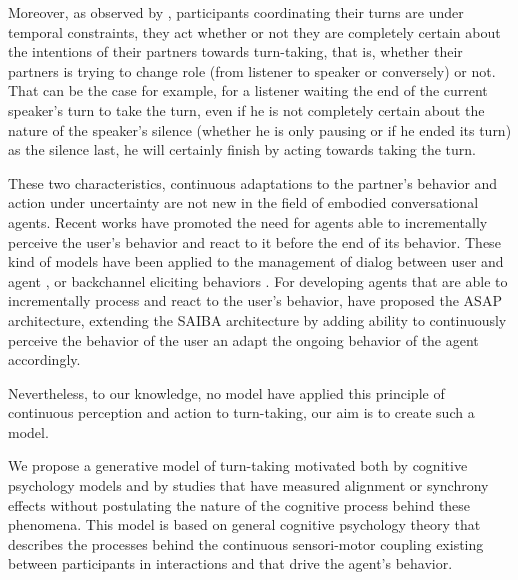  Moreover, as observed by \cite{thorisson_natural_2002}, participants coordinating their turns are under temporal constraints, they act whether or not they are completely certain about the intentions of their partners towards turn-taking, that is, whether their partners is trying to change role (from listener to speaker or conversely) or not. That can be the case for example, for a listener waiting the end of the current speaker's turn to take the turn, even if he is not completely certain about the nature of the speaker's silence (whether he is only pausing or if he ended its turn) as the silence last, he will certainly finish by acting towards taking the turn.
 	
 These two characteristics, continuous adaptations to the partner's behavior and action under uncertainty are not new in the field of embodied conversational agents. Recent works have promoted the need for agents able to incrementally perceive the user's behavior and react to it before the end of its behavior. These kind of models have been applied to the management of dialog between user and agent \cite{skantze_towards_2010}, or backchannel eliciting behaviors \cite{bushmeier_when_2014}. For developing agents that are able to incrementally process and react to the user's behavior, \cite{kopp_architecture_2014} have proposed the ASAP architecture, extending the SAIBA architecture by adding ability to continuously perceive the behavior of the user an adapt the ongoing behavior of the agent accordingly. 
 
 Nevertheless, to our knowledge, no model have applied this principle of continuous perception and action to turn-taking, our aim is to create such a model. 

We propose a generative model of turn-taking motivated both by cognitive psychology models and by studies
that have measured alignment or synchrony effects without postulating the nature of the cognitive process
behind these phenomena. This model is based on general cognitive psychology theory that describes the
processes behind the continuous sensori-motor coupling existing between participants in interactions and that
drive the agent's behavior.



